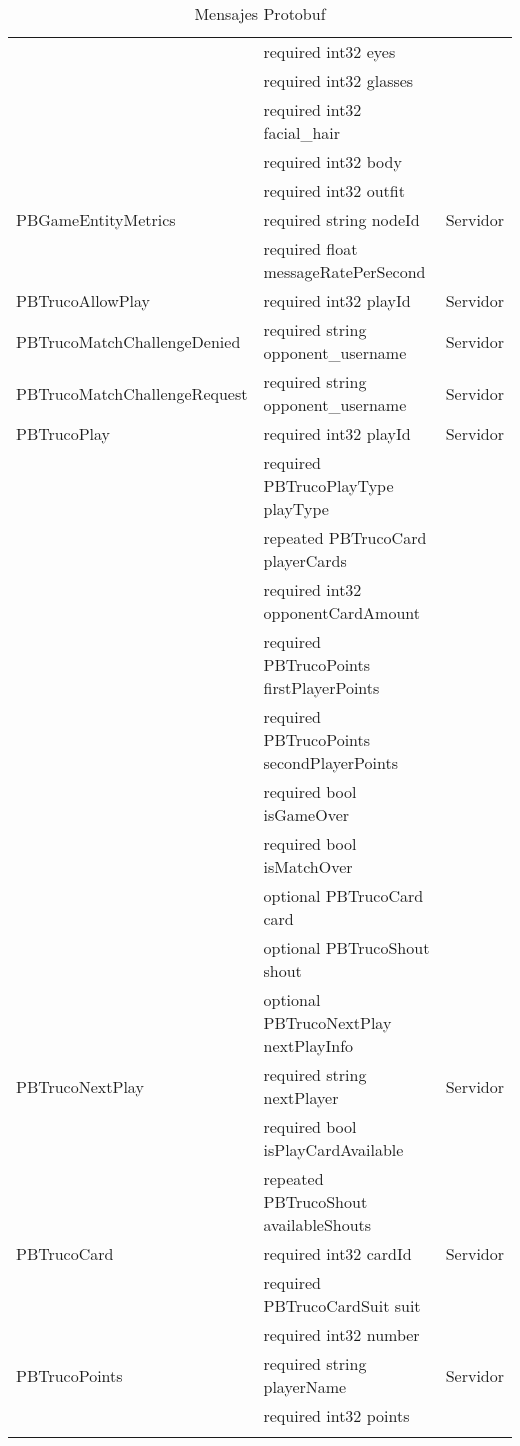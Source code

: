 \begin{longtable}{|p{}|p{}|p{}|}
                            & required int32 eyes & \\
                            & required int32 glasses & \\
                            & required int32 facial\_hair & \\
                            & required int32 body & \\
                            & required int32 outfit & \\
    \hline
    PBGameEntityMetrics & required string nodeId & Servidor \\
                        & required float messageRatePerSecond & \\
    \hline
    PBTrucoAllowPlay & required int32 playId & Servidor \\
    \hline
    PBTrucoMatchChallengeDenied & required string opponent\_username & Servidor \\
    \hline
    PBTrucoMatchChallengeRequest & required string opponent\_username & Servidor \\
    \hline
    PBTrucoPlay & required int32 playId & Servidor \\
                & required PBTrucoPlayType playType & \\
                & repeated PBTrucoCard playerCards & \\
                & required int32 opponentCardAmount & \\
                & required PBTrucoPoints firstPlayerPoints & \\
                & required PBTrucoPoints secondPlayerPoints & \\
                & required bool isGameOver & \\
                & required bool isMatchOver & \\
                & optional PBTrucoCard card & \\
                & optional PBTrucoShout shout & \\
                & optional PBTrucoNextPlay nextPlayInfo & \\
    \hline
    PBTrucoNextPlay & required string nextPlayer & Servidor \\
                    & required bool isPlayCardAvailable & \\
                    & repeated PBTrucoShout availableShouts & \\
    \hline
    PBTrucoCard & required int32 cardId & Servidor \\
                & required PBTrucoCardSuit suit & \\
                & required int32 number & \\
    \hline
    PBTrucoPoints & required string playerName & Servidor \\
                    & required int32 points & \\
    \hline

    \caption{Mensajes Protobuf} \\
\end{longtable}
